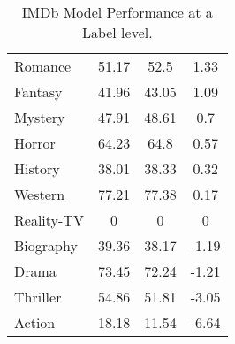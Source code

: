 \begin{table}[htbp]
\begin{tabular}{l|c|c|c|}
Romance                    & 51.17                                                               & 52.5                                                            & 1.33                                                              \\
Fantasy                    & 41.96                                                               & 43.05                                                           & 1.09                                                              \\
Mystery                    & 47.91                                                               & 48.61                                                           & 0.7                                                               \\
Horror                     & 64.23                                                               & 64.8                                                            & 0.57                                                              \\
History                    & 38.01                                                               & 38.33                                                           & 0.32                                                              \\
Western                    & 77.21                                                               & 77.38                                                           & 0.17                                                              \\
Reality-TV                 & 0                                                                   & 0                                                               & 0                                                                 \\
Biography                  & 39.36                                                               & 38.17                                                           & -1.19                                                             \\
Drama                      & 73.45                                                               & 72.24                                                           & -1.21                                                             \\
Thriller                   & 54.86                                                               & 51.81                                                           & -3.05                                                             \\
Action                     & 18.18                                                               & 11.54                                                           & -6.64                                                            
\end{tabular}
\caption{\label{tab:widgets}IMDb Model Performance at a Label level.}
\end{table}

